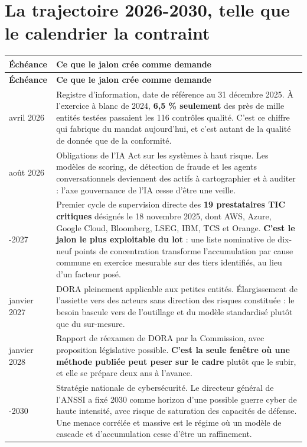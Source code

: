 \documentclass[11pt,a4paper]{article}
\begin{document}
\section{La trajectoire 2026-2030, telle que le calendrier la contraint}

\begin{small}
\begin{longtable}{@{}L{2.5cm} L{11.4cm}@{}}
\toprule
\textbf{Échéance} & \textbf{Ce que le jalon crée comme demande} \\
\midrule
\endfirsthead
\toprule
\textbf{Échéance} & \textbf{Ce que le jalon crée comme demande} \\
\midrule
\endhead
\bottomrule
{} avril 2026
& Registre d'information, date de référence au 31 décembre 2025. À l'exercice à blanc de 2024,
  \textbf{6,5 \% seulement} des près de mille entités testées passaient les 116 contrôles
  qualité. C'est ce chiffre qui fabrique du mandat aujourd'hui, et c'est autant de la qualité de
  donnée que de la conformité. \\
 août 2026
& Obligations de l'IA Act sur les systèmes à haut risque. Les modèles de scoring, de détection
  de fraude et les agents conversationnels deviennent des actifs à cartographier et à auditer :
  l'axe gouvernance de l'IA cesse d'être une veille. \\
-2027
& Premier cycle de supervision directe des \textbf{19 prestataires TIC critiques} désignés le
  18 novembre 2025, dont AWS, Azure, Google Cloud, Bloomberg, LSEG, IBM, TCS et Orange.
  \textbf{C'est le jalon le plus exploitable du lot} : une liste nominative de dix-neuf points de
  concentration transforme l'accumulation par cause commune en exercice mesurable sur des tiers
  identifiés, au lieu d'un facteur posé. \\
 janvier 2027
& DORA pleinement applicable aux petites entités. Élargissement de l'assiette vers des acteurs
  sans direction des risques constituée : le besoin bascule vers de l'outillage et du modèle
  standardisé plutôt que du sur-mesure. \\
 janvier 2028
& Rapport de réexamen de DORA par la Commission, avec proposition législative possible.
  \textbf{C'est la seule fenêtre où une méthode publiée peut peser sur le cadre} plutôt que le
  subir, et elle se prépare deux ans à l'avance. \\
-2030
& Stratégie nationale de cybersécurité. Le directeur général de l'ANSSI a fixé 2030 comme
  horizon d'une possible guerre cyber de haute intensité, avec risque de saturation des capacités
  de défense. Une menace corrélée et massive est le régime où un modèle de cascade et
  d'accumulation cesse d'être un raffinement. \\
\end{longtable}
\end{small}
\end{document}

